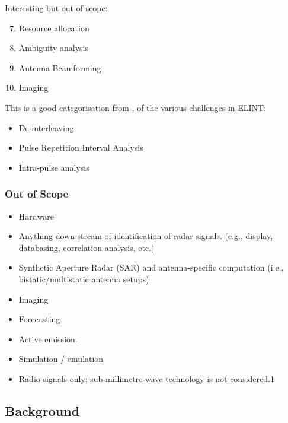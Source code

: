 Interesting but out of scope:
\begin{enumerate}
  \setcounter{enumi}{6}
    \item Resource allocation
    \item Ambiguity analysis
    \item Antenna Beamforming
    \item Imaging
\end{enumerate}

This is a good categorisation from \cite{wiley_elint_2006}, of the various challenges in ELINT:

\begin{itemize}
    \item De-interleaving
    \item Pulse Repetition Interval Analysis
    \item Intra-pulse analysis
\end{itemize}

\subsubsection{Out of Scope}

\begin{itemize}
    \item Hardware
    \item Anything down-stream of identification of radar signals. (e.g., display, databasing, correlation analysis, etc.)
    \item Synthetic Aperture Radar (SAR) and antenna-specific computation (i.e., bistatic/multistatic antenna setups)
    \item Imaging
    \item Forecasting
    \item Active emission.
    \item Simulation / emulation
    \item Radio signals only; sub-millimetre-wave technology is not considered.1
\end{itemize}

\subsection{Background}

